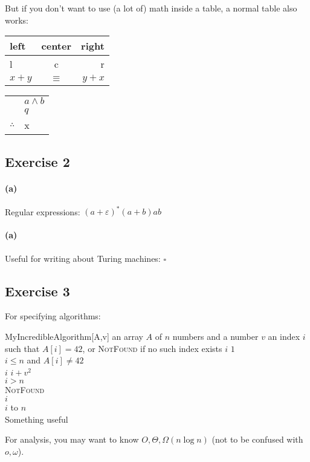 \documentclass[a4paper,twoside,11pt]{article}
\begin{document}
But if you don't want to use (a lot of) math inside a table, a normal table also works:\\
\begin{tabular}{lcr}
left & center & right \\
\hline
l & c & r \\
$x+y$ & $\equiv$ & $y + x$ \\
\end{tabular}

\begin{tabular}{rl}
& $a \wedge b$ \\
& $q$ \\
\hline
$\therefore$ & x 
\end{tabular}

\subsection*{Exercise 2}

\paragraph{(a)} Regular expressions: $(a + \varepsilon)^* (a+b) ab$
\paragraph{(a)} Useful for writing about Turing machines: $\square$

\subsection*{Exercise 3}

For specifying algorithms:

\begin{algorithm}{\sc MyIncredibleAlgorithm}[A,v]{
    \qinput an array $A$ of $n$ numbers and a number $v$
    \qoutput an index $i$ such that $A[i] = 42$, or \textsc{NotFound} if no such index exists}
    $i$ \qlet $1$ \\
    \qwhile $i \leq n$ and $A[i] \neq 42$ \\
     \qdo $i$ \qlet $i + v^2$ \qend \\
    \qif $i > n$ \\
    \qthen \qreturn \textsc{NotFound}\\
    \qelse \qreturn $i$ \qfi\\
    \qfor $i$  to $n$ \\
    \qdo Something useful \qend
\end{algorithm}

For analysis, you may want to know $O, \Theta, \Omega(n \log n)$ (not to be confused with $o, \omega$).
\end{document}
